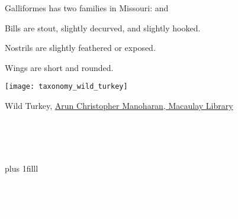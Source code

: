 \documentclass[t]{beamer}
\newcommand{\backoneline}{\vspace{-\baselineskip}}
\begin{document}
\begin{frame}{Galliformes has two families in Missouri:  and }

\backoneline

\begin{multicols}{2}
Bills are stout, slightly decurved, and slightly hooked.

\vspace{\baselineskip}

Nostrils are slightly feathered or exposed.

\vspace{\baselineskip}

Wings are short and rounded.

\columnbreak


\texttt{[image: taxonomy\_wild\_turkey]}

\end{multicols}

\vfilll

\tinyfill Wild Turkey, \href{https://macaulaylibrary.org/asset/536973431}{Arun Christopher Manoharan, Macaulay Library}
\end{frame}

{
\begin{frame}[t,plain]

	\hangpara\Large\textcolor{white}{Odontophoridae contain the quail. \\ They are small birds with\\short, rounded tails.}
	
	\vskip0pt plus 1filll
	
	\tiny\textcolor{white}{Bobwhite Quail by Les Howard, Flickr Creative Commons.}
\end{frame}
}


{
\begin{frame}[b,plain]


	\tiny\textcolor{white}{Greater Prairie Chicken by Tony Ifland/USFWS.}
\end{frame}
}
\end{document}
